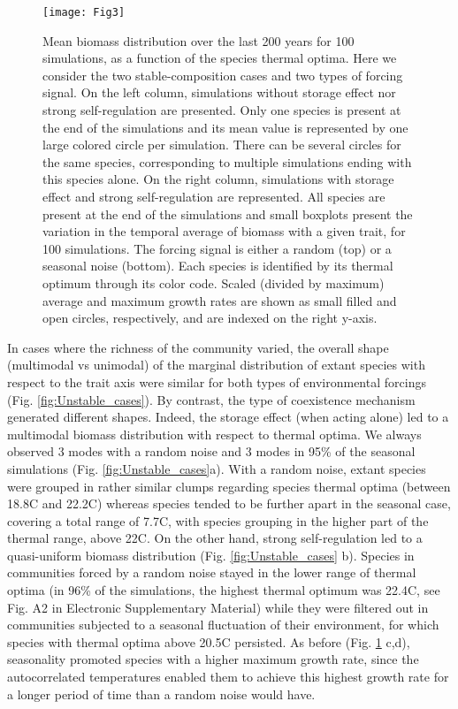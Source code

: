\documentclass[a4paper,12pt]{article}
\begin{document}
\begin{figure}[!ht]
\begin{centering}
\texttt{[image: Fig3]}
\par\end{centering}
\caption{Mean biomass distribution over the last 200 years for 100 simulations,
as a function of the species thermal optima. Here we consider the
two stable-composition cases and two types of forcing signal. On the
left column, simulations without storage effect nor strong self-regulation
are presented. Only one species is present at the end of the simulations
and its mean value is represented by one large colored circle per
simulation. There can be several circles for the same species, corresponding
to multiple simulations ending with this species alone. On the right
column, simulations with storage effect and strong self-regulation
are represented. All species are present at the end of the simulations
and small boxplots present the variation in the temporal average of
biomass with a given trait, for 100 simulations. The forcing signal
is either a random (top) or a seasonal noise (bottom). Each species
is identified by its thermal optimum through its color code. Scaled
(divided by maximum) average and maximum growth rates are shown as
small filled and open circles, respectively, and are indexed on the
right y-axis. \label{fig:Mean-biomass-in_stable_cases}}
\end{figure}

In cases where the richness of the community varied, the overall shape
(multimodal vs unimodal) of the marginal distribution of extant species
with respect to the trait axis were similar for both types of environmental
forcings (Fig. \ref{fig:Unstable_cases}). By contrast, the type of
coexistence mechanism generated different shapes. Indeed, the storage
effect (when acting alone) led to a multimodal biomass distribution
with respect to thermal optima. We always observed 3 modes with a
random noise and 3 modes in 95\% of the seasonal simulations (Fig.
\ref{fig:Unstable_cases}a). With a random noise, extant species were
grouped in rather similar clumps regarding species thermal optima
(between 18.8\textdegree C and 22.2\textdegree C) whereas species tended to be further apart
in the seasonal case, covering a total range of 7.7\textdegree C, with species
grouping in the higher part of the thermal range, above 22\textdegree C. On the
other hand, strong self-regulation led to a quasi-uniform biomass
distribution (Fig. \ref{fig:Unstable_cases} b). Species in communities
forced by a random noise stayed in the lower range of thermal optima
(in 96\% of the simulations, the highest thermal optimum was 22.4\textdegree C,
see Fig. A2 in Electronic Supplementary Material) while they were
filtered out in communities subjected to a seasonal fluctuation of
their environment, for which species with thermal optima above 20.5\textdegree C
persisted. As before (Fig. \ref{fig:Mean-biomass-in_stable_cases}
c,d), seasonality promoted species with a higher maximum growth rate,
since the autocorrelated temperatures enabled them to achieve this
highest growth rate for a longer period of time than a random noise
would have.
\end{document}
